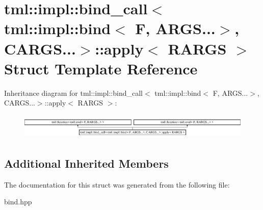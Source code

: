 \hypertarget{structtml_1_1impl_1_1bind__call_3_01tml_1_1impl_1_1bind_3_01F_00_01ARGS_8_8_8_4_00_01CARGS_8_8_8_4_1_1apply}{\section{tml\+:\+:impl\+:\+:bind\+\_\+call$<$ tml\+:\+:impl\+:\+:bind$<$ F, A\+R\+G\+S...$>$, C\+A\+R\+G\+S...$>$\+:\+:apply$<$ R\+A\+R\+G\+S $>$ Struct Template Reference}
\label{structtml_1_1impl_1_1bind__call_3_01tml_1_1impl_1_1bind_3_01F_00_01ARGS_8_8_8_4_00_01CARGS_8_8_8_4_1_1apply}
}
Inheritance diagram for tml\+:\+:impl\+:\+:bind\+\_\+call$<$ tml\+:\+:impl\+:\+:bind$<$ F, A\+R\+G\+S...$>$, C\+A\+R\+G\+S...$>$\+:\+:apply$<$ R\+A\+R\+G\+S $>$\+:\begin{figure}[H]
\begin{center}
\leavevmode
\includegraphics[height=1.214751cm]{structtml_1_1impl_1_1bind__call_3_01tml_1_1impl_1_1bind_3_01F_00_01ARGS_8_8_8_4_00_01CARGS_8_8_8_4_1_1apply}
\end{center}
\end{figure}
\subsection*{Additional Inherited Members}


The documentation for this struct was generated from the following file\+:\begin{DoxyCompactItemize}
\item 
bind.\+hpp\end{DoxyCompactItemize}
